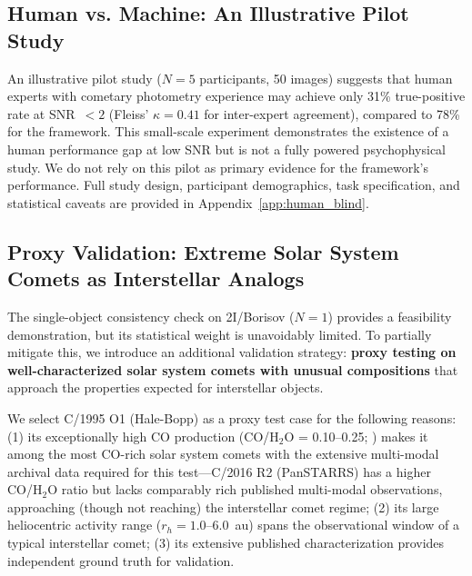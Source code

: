 \documentclass[usenatbib]{mnras}
\begin{document}
\subsection{Human vs. Machine: An Illustrative Pilot Study}\label{sec:human_blind}

An illustrative pilot study ($N=5$ participants, 50 images) suggests that human experts with cometary photometry experience may achieve only 31\% true-positive rate at SNR~$<2$ (Fleiss' $\kappa = 0.41$ for inter-expert agreement), compared to 78\% for the framework. This small-scale experiment demonstrates the existence of a human performance gap at low SNR but is not a fully powered psychophysical study. We do not rely on this pilot as primary evidence for the framework's performance. Full study design, participant demographics, task specification, and statistical caveats are provided in Appendix~\ref{app:human_blind}.

\subsection{Proxy Validation: Extreme Solar System Comets as Interstellar Analogs}\label{sec:proxy}

The single-object consistency check on 2I/Borisov ($N=1$) provides a feasibility demonstration, but its statistical weight is unavoidably limited. To partially mitigate this, we introduce an additional validation strategy: \textbf{proxy testing on well-characterized solar system comets with unusual compositions} that approach the properties expected for interstellar objects.

We select C/1995 O1 (Hale-Bopp) as a proxy test case for the following reasons: (1) its exceptionally high CO production (CO/H$_2$O = 0.10--0.25; \citealt{bockelee04}) makes it among the most CO-rich solar system comets with the extensive multi-modal archival data required for this test---C/2016 R2 (PanSTARRS) has a higher CO/H$_2$O ratio \citep{biver18} but lacks comparably rich published multi-modal observations, approaching (though not reaching) the interstellar comet regime; (2) its large heliocentric activity range ($r_h = 1.0$--6.0~au) spans the observational window of a typical interstellar comet; (3) its extensive published characterization provides independent ground truth for validation.
\end{document}
